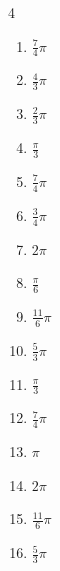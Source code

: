 \begin{multicols}{4}
\begin{enumerate}
  \item $\displaystyle \frac{7}{4}\pi$

  \item $\displaystyle \frac{4}{3}\pi$

  \item $\displaystyle \frac{2}{3}\pi$

  \item $\displaystyle \frac{\pi}{3}$

  \item $\displaystyle \frac{7}{4}\pi$

  \item $\displaystyle \frac{3}{4}\pi$

  \item $\displaystyle 2\pi$

  \item $\displaystyle \frac{\pi}{6}$

  \item $\displaystyle \frac{11}{6}\pi$

  \item $\displaystyle \frac{5}{3}\pi$

  \item $\displaystyle \frac{\pi}{3}$

  \item $\displaystyle \frac{7}{4}\pi$

  \item $\displaystyle \pi$

  \item $\displaystyle 2\pi$

  \item $\displaystyle \frac{11}{6}\pi$

  \item $\displaystyle \frac{5}{3}\pi$


\end{enumerate}
\end{multicols}
